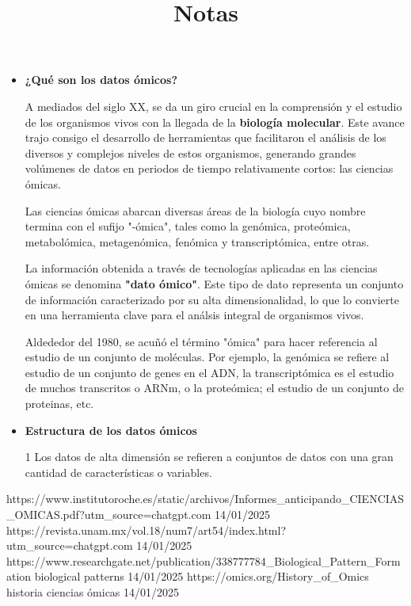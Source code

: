 \documentclass{article}
\begin{document}
\title{Notas}

\begin{itemize}
    \item \textbf{¿Qué son los datos ómicos?}

    A mediados del siglo XX, se da un giro crucial en la comprensión y el estudio de los organismos vivos con
    la llegada de la \textbf{biología molecular}. Este avance trajo consigo el desarrollo de herramientas que
    facilitaron el análisis de los diversos y complejos niveles de estos organismos, generando grandes volúmenes
    de datos en periodos de tiempo relativamente cortos: las ciencias ómicas.

    Las ciencias ómicas abarcan diversas áreas de la biología cuyo nombre termina con el sufijo "-ómica", tales
    como la genómica, proteómica, metabolómica, metagenómica, fenómica y transcriptómica, entre otras.
    
    La información obtenida a través de tecnologías aplicadas en las ciencias ómicas se denomina \textbf{"dato ómico"}.
    Este tipo de dato representa un conjunto de información caracterizado por su alta dimensionalidad, lo que lo
    convierte en una herramienta clave para el análsis integral de organismos vivos.

    Aldededor del 1980, se acuñó el término "ómica" para hacer referencia al estudio de un conjunto de moléculas. Por
    ejemplo, la genómica se refiere al estudio de un conjunto de genes en el ADN, la transcriptómica es el estudio de
    muchos transcritos o ARNm, o la proteómica; el estudio de un conjunto de proteinas, etc.
    
    
    \item \textbf{Estructura de los datos ómicos}



    1 Los datos de alta dimensión se refieren a conjuntos de datos con una gran cantidad de características
    o variables. 

\end{itemize}


https://www.institutoroche.es/static/archivos/Informes_anticipando_CIENCIAS_OMICAS.pdf?utm_source=chatgpt.com 14/01/2025
https://revista.unam.mx/vol.18/num7/art54/index.html?utm_source=chatgpt.com  14/01/2025
https://www.researchgate.net/publication/338777784_Biological_Pattern_Formation biological patterns 14/01/2025
https://omics.org/History_of_Omics historia ciencias ómicas 14/01/2025
\end{document}
